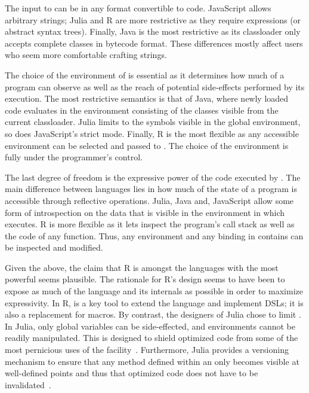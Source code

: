 \documentclass[acmsmall, screen]{acmart}
\begin{document}
The input to \eval can be in any format convertible to code. JavaScript allows
arbitrary strings; Julia and R are more restrictive as they require expressions
(or abstract syntax trees). Finally, Java is the most restrictive as its
classloader only accepts complete classes in bytecode format. These differences
mostly affect users who seem more comfortable crafting strings.

The choice of the environment of \eval is essential as it determines how much of
a program \eval can observe as well as the reach of potential side-effects
performed by its execution. The most restrictive semantics is that of Java,
where newly loaded code evaluates in the environment consisting of the classes
visible from the current classloader. Julia limits \eval to the symbols visible
in the global environment, so does JavaScript's strict mode. Finally, R is the most
flexible as any accessible environment can be selected and passed to \eval. The
choice of the environment is fully under the programmer's control.

The last degree of freedom is the expressive power of the code executed by
\eval. The main difference between languages lies in how much of the state of a
program is accessible through reflective operations. Julia, Java and, JavaScript
allow some form of introspection on the data that is visible in the environment
in which \eval executes. R is more flexible as it lets \eval inspect the program's
call stack as well as the code of any function. Thus, any environment and any
binding in contains can be inspected and modified.

Given the above, the claim that R is amongst the languages with the most
powerful \eval seems plausible. The rationale for R's design seems to have been
to expose as much of the language and its internals as possible in order to
maximize expressivity. In R, \eval is a key tool to extend the language and
implement DSLs; it is also a replacement for macros. By contrast, the designers
of Julia chose to limit \eval. In Julia, only global variables can be
side-effected, and environments cannot be readily manipulated. This is designed
to shield optimized code from some of the most pernicious uses of the
facility~\cite{oopsla18a}. Furthermore, Julia provides a versioning mechanism to
ensure that any method defined within an \eval only becomes visible at
well-defined points and thus that optimized code does not have to be
invalidated~\cite{oopsla20a}.
\end{document}
